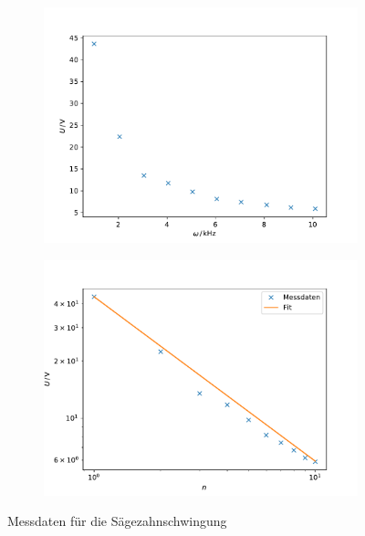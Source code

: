 \begin{figure}[h]
\begin{subfigure}{0.5\textwidth}
    \centering
    \includegraphics[width=\textwidth]{assets/zahn_messung.pdf}
\end{subfigure}
\begin{subfigure}{0.5\textwidth}
    \centering
    \includegraphics[width=\textwidth]{assets/zahn_log.pdf}
\end{subfigure}
\caption{Messdaten für die Sägezahnschwingung}
\label{fig:zahn_fit}
\end{figure}
